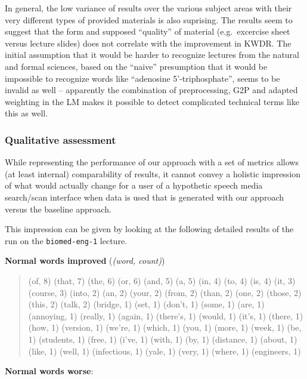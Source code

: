 \documentclass[]{article}
\begin{document}
In general, the low variance of results over the various subject areas
with their very different types of provided materials is also suprising.
The results seem to suggest that the form and supposed ``quality'' of
material (e.g.~excercise sheet versus lecture slides) does not correlate
with the improvement in KWDR. The initial assumption that it would be
harder to recognize lectures from the natural and formal sciences, based
on the ``naive'' presumption that it would be impossible to recognize
words like ``adenosine 5'-triphosphate'', seems to be invalid as well --
apparently the combination of preprocessing, G2P and adapted weighting
in the LM makes it possible to detect complicated technical terms like
this as well.

\subsubsection{Qualitative assessment}\label{qualitative-assessment}

While representing the performance of our approach with a set of metrics
allows (at least internal) comparability of results, it cannot convey a
holistic impression of what would actually change for a user of a
hypothetic speech media search/scan interface when data is used that is
generated with our approach versus the baseline approach.

This impression can be given by looking at the following detailed
results of the run on the \texttt{biomed-eng-1} lecture.

\small{} \textbf{Normal words improved} (\emph{(word, count)})

\begin{quote}
(of, 8) (that, 7) (the, 6) (or, 6) (and, 5) (a, 5) (in, 4) (to, 4) (is,
4) (it, 3) (course, 3) (into, 2) (an, 2) (your, 2) (from, 2) (than, 2)
(one, 2) (those, 2) (this, 2) (talk, 2) (bridge, 1) (set, 1) (don't, 1)
(some, 1) (are, 1) (annoying, 1) (really, 1) (again, 1) (there's, 1)
(would, 1) (it's, 1) (there, 1) (how, 1) (version, 1) (we're, 1) (which,
1) (you, 1) (more, 1) (week, 1) (be, 1) (students, 1) (free, 1) (i've,
1) (with, 1) (by, 1) (distance, 1) (about, 1) (like, 1) (well, 1)
(infectious, 1) (yale, 1) (very, 1) (where, 1) (engineers, 1)
\end{quote}

\textbf{Normal words worse}:
\end{document}
